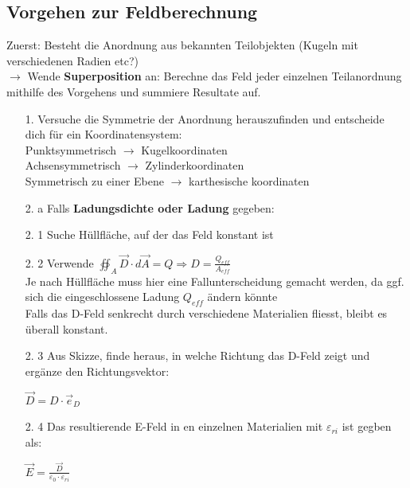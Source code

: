 \subsection{Vorgehen zur Feldberechnung}
\beginvor
Zuerst: Besteht die Anordnung aus bekannten Teilobjekten (Kugeln mit verschiedenen Radien etc?) \\
$\rightarrow$ Wende \textbf{Superposition} an: Berechne das Feld jeder einzelnen Teilanordnung mithilfe des Vorgehens und summiere Resultate auf.
\\
\begin{itemize}

	\item [1. ] Versuche die Symmetrie der Anordnung herauszufinden und entscheide dich für ein Koordinatensystem: \\
	Punktsymmetrisch $\rightarrow$ Kugelkoordinaten \\
	Achsensymmetrisch $\rightarrow$ Zylinderkoordinaten \\
	Symmetrisch zu einer Ebene $\rightarrow$ karthesische koordinaten\\

	\item [2. a]Falls \textbf{Ladungsdichte oder Ladung} gegeben: \\
\end{itemize}
	\beginip
	\begin{itemize}

	\item [2. 1]  Suche Hüllfläche, auf der das Feld konstant ist


	\item [2. 2] Verwende $\displaystyle \oiint_A \vec{D} \cdot d\vec{A} = Q \Rightarrow D = \frac{Q_{eff}}{A_{eff}}$ \\
	Je nach Hüllfläche muss hier eine Fallunterscheidung gemacht werden, da ggf. sich die eingeschlossene Ladung $Q_{eff}$ ändern könnte\\
	Falls das D-Feld senkrecht durch verschiedene Materialien fliesst, bleibt es überall konstant.

	\item [2. 3] Aus Skizze, finde heraus, in welche Richtung das D-Feld zeigt und ergänze den Richtungsvektor:
	\begin{center}
		$\vec{D} = D \cdot \vec{e}_D$
	\end{center}

	\item [2. 4] Das resultierende E-Feld in en einzelnen Materialien mit $\varepsilon_{ri}$ ist gegben als:
	\begin{center}
			$\displaystyle \vec{E} = \frac{\vec{D}}{\varepsilon_0 \cdot \varepsilon_{ri}}$
	\end{center}
\end{itemize}
